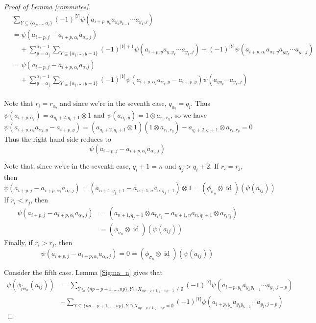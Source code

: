 \documentclass[11pt]{amsart}
\def\s{{\sigma}}
\def\a{\alpha}
\def\fp{{\scriptstyle \bar{\bar{p}}}}
\newcommand\id{\operatorname{id}}
\theoremstyle{definition}
\begin{document}
\begin{proof} [Proof of Lemma \ref{commutes}]
\begin{align*}
& \sum_{Y\subseteq \{\a_j,\ldots,\a_i\}}(-1)^{|Y|}\psi\left(a_{i+p,y_k}a_{y_ky_{k-1}}\cdots a_{y_1,j}\right)\\
&= \psi\left(a_{i+p,j} - a_{i+p,\a_i}a_{\a_i,j}\right)\\
& \;\;\;\;+ \sum_{y=\a_j}^{\a_i-1}\sum_{Y\subseteq \{\a_j,\ldots,y-1\}}(-1)^{|Y|+1}\psi\left(a_{i + p, y}a_{y,y_k}\cdots a_{y_1,j}\right) + (-1)^{|Y|}\psi\left(a_{i+p,\a_i}a_{\a_i,y}a_{yy_k}\cdots a_{y_1,j}\right)\\
&= \psi\left(a_{i+p,j} - a_{i+p,\a_i}a_{\a_ij}\right)\\
& \;\;\;\;+ \sum_{y=\a_j}^{\a_i-1}\sum_{Y\subseteq \{\a_j,\ldots,y-1\}}(-1)^{|Y|}\psi\left(a_{i+p,\a_i}a_{\a_i,y} - a_{i+p,y}\right)\psi\left(a_{yy_k}\cdots a_{y_1,j}\right)\\
\end{align*}



Note that $r_i = r_{\a_i}$ and since we're in the seventh case, $q_{\a_i}=q_i$.  Thus $\psi(a_{i+p,\a_i}) = a_{q_i+2,q_i+1}\otimes 1$ and $\psi(a_{\a_i,y}) = 1\otimes a_{r_i,r_y}$, so we have
$$\psi(a_{i+p,\a_i}a_{\a_i,y} - a_{i+p,y}) = \left(a_{q_i+2,q_i+1}\otimes  	1\right)\left(1\otimes a_{r_i,r_y}\right) - a_{q_i+2,q_i+1}\otimes a_{r_i,r_y} = 0$$
Thus the right hand side reduces to 
$$\psi\left(a_{i+p,j} - a_{i+p,\a_i}a_{\a_i,j}\right)$$

\noindent Note that, since we're in the seventh case, $q_i + 1 = n$ and $q_j > q_i + 2$.  If $r_i = r_j$, then 
$$\psi\left(a_{i+p,j} - a_{i+p,\a_i}a_{\a_i,j}\right) = \left(a_{n+1,q_j + 1} - a_{n+1,n}a_{n,q_j + 1}\right)\otimes 1 = (\phi_{\s_n} \otimes \id)(\psi(a_{ij}))$$
If $r_i < r_j$, then
\begin{align*}
\psi\left(a_{i+p,j} - a_{i+p,\a_i}a_{\a_i,j}\right) &= \left(a_{n+1,q_j + 1}\otimes a_{r_ir_j} - a_{n+1,n}a_{n,q_j + 1}\otimes a_{r_ir_j}\right)\\
&= (\phi_{\s_n} \otimes \id)(\psi(a_{ij}))
\end{align*}
Finally, if $r_i > r_j$, then
$$\psi\left(a_{i+p,j} - a_{i+p,\a_i}a_{\a_i,j}\right) = 0 = (\phi_{\s_n} \otimes \id)(\psi(a_{ij}))$$



\noindent Consider the fifth case.  Lemma \ref{Sigma_n} gives that
\begin{align*}
\psi\left(\phi_{\fp \s_n}(a_{ij})\right) &= \sum_{Y\subseteq \{np-p+1,\ldots,np\},Y\cap X_{np-p+1,j-np-1}\ne\emptyset}(-1)^{|Y|}\psi(a_{i+p,y_k}a_{y_ky_{k-1}}\cdots a_{y_1,j-p})\\
 &- \sum_{Y\subseteq \{np-p+1,\ldots,np\},Y\cap X_{np-p+1,j-np}=\emptyset}(-1)^{|Y|}\psi(a_{i+p,y_k}a_{y_ky_{k-1}}\cdots a_{y_1,j-p})
\end{align*}






\end{proof}
\end{document}
